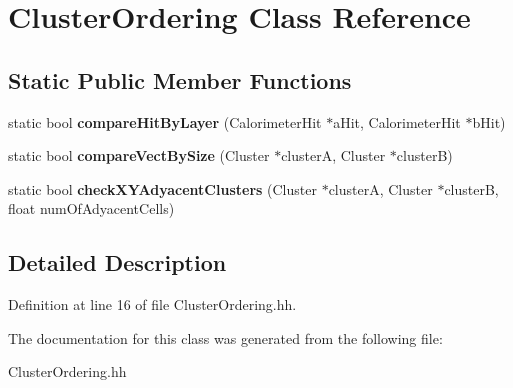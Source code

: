 \section{Cluster\-Ordering Class Reference}
\label{classClusterOrdering}
\subsection*{Static Public Member Functions}
\begin{DoxyCompactItemize}
\item 
static bool {\bfseries compare\-Hit\-By\-Layer} (Calorimeter\-Hit $\ast$a\-Hit, Calorimeter\-Hit $\ast$b\-Hit)\label{classClusterOrdering_a98385e73ef0f15d8093401c950dc235d}

\item 
static bool {\bfseries compare\-Vect\-By\-Size} (Cluster $\ast$cluster\-A, Cluster $\ast$cluster\-B)\label{classClusterOrdering_a65fe903f58c543c843b84c2d7ee17d05}

\item 
static bool {\bfseries check\-X\-Y\-Adyacent\-Clusters} (Cluster $\ast$cluster\-A, Cluster $\ast$cluster\-B, float num\-Of\-Adyacent\-Cells)\label{classClusterOrdering_a5f63b93db02d903b457eb1a56da2d49a}

\end{DoxyCompactItemize}


\subsection{Detailed Description}


Definition at line 16 of file Cluster\-Ordering.\-hh.



The documentation for this class was generated from the following file\-:\begin{DoxyCompactItemize}
\item 
Cluster\-Ordering.\-hh\end{DoxyCompactItemize}
